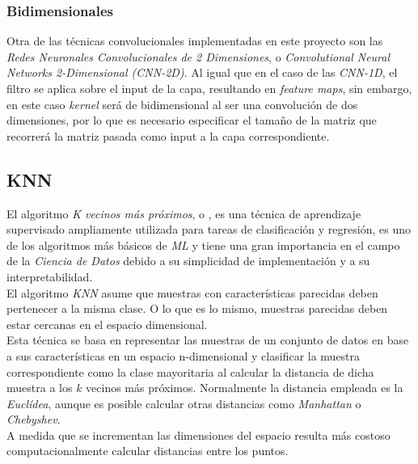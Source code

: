                
            \subsubsection {Bidimensionales}
                Otra de las técnicas convolucionales implementadas en este proyecto son las \textit{Redes Neuronales Convolucionales de 2 Dimensiones}, o \textit{Convolutional Neural Networks 2-Dimensional (CNN-2D)}. Al igual que en el caso de las \textit{CNN-1D}, el filtro se aplica sobre el input de la capa, resultando en \textit{feature maps}, sin embargo, en este caso \textit{kernel} será de bidimensional al ser una convolución de dos dimensiones, por lo que es necesario especificar el tamaño de la matriz que recorrerá la matriz pasada como input a la capa correspondiente.

                \textit{}

        \subsection {KNN}

            El algoritmo \textit{K vecinos más próximos}, o  \cite{KNN}, es una técnica de aprendizaje supervisado ampliamente utilizada para tareas de clasificación y regresión, es uno de los algoritmos más básicos de \textit{ML} y tiene una gran importancia en el campo de la \textit{Ciencia de Datos} debido a su simplicidad de implementación y a su interpretabilidad.\\

            El algoritmo \textit{KNN} asume que muestras con características parecidas deben pertenecer a la misma clase. O lo que es lo mismo, muestras parecidas deben estar cercanas en el espacio dimensional.\\

            Esta técnica se basa en representar las muestras de un conjunto de datos en base a sus características en un espacio n-dimensional y clasificar la muestra correspondiente como la clase mayoritaria al calcular la distancia de dicha muestra a los $k$ vecinos más próximos. Normalmente la distancia empleada es la \textit{Euclídea}, aunque es posible calcular otras distancias como \textit{Manhattan} o \textit{Chebyshev}.\\
            
            A medida que se incrementan las dimensiones del espacio resulta más costoso computacionalmente calcular distancias entre los puntos.\\


